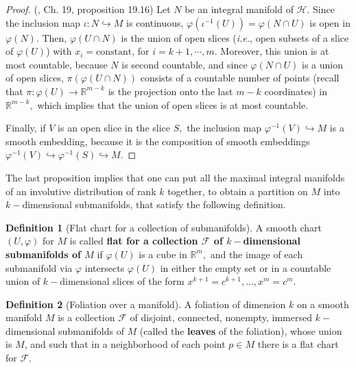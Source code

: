 \documentclass[12pt, letterpaper, reqno]{amsart}
\theoremstyle{definition}
\newtheorem{df}{Definition}
\theoremstyle{plain}
\theoremstyle{remark}
\begin{document}
\begin{proof}(\cite{lee2003introduction}, Ch. 19, proposition 19.16)
	Let $ N $ be an integral manifold of $ \mathcal{H}. $ Since the inclusion map $ \iota: N \hookrightarrow M $ is continuous, $ \varphi( \iota^{-1}(U))=\varphi(N\cap U) $  is open in $ \varphi(N) $. Then, $ \varphi(U\cap N) $ is the union of open slices (\textit{i.e.}, open subsets of a slice of $ \varphi(U)$) with $ x_i=\text{constant} $, for $ i=k+1,\cdots,m.$ Moreover, this union is at most countable, because $ N $ is second countable, and since $ \varphi(N\cap U) $ is a union of open slices, $ \pi(\varphi(U\cap N)) $ consists of a countable number of points (recall that $ \pi: \varphi(U) \rightarrow \mathbb{R}^{m-k} $ is the projection onto the last $ m-k $ coordinates) in $ \mathbb{R}^{m-k}, $ which implies that the union of open slices is at most countable.  

	Finally, if $ V $ is an open slice in the slice $ S, $ the inclusion map $ \varphi^{-1}(V) \hookrightarrow M $ is a smooth embedding, because it is the composition of smooth embeddings $ \varphi^{-1}(V)\hookrightarrow \varphi^{-1}(S) \hookrightarrow M.$ 
\end{proof}

The last proposition implies that one can put all the maximal integral manifolds of an involutive distribution of rank $ k $  together, to obtain a partition on $ M $ into $ k- $dimensional submanifolds, that satisfy the following definition.
\begin{df}[Flat chart for a collection of submanifolds]
	A smooth chart $ (U,\varphi) $ for $ M $ is called \textbf{flat for a collection $ \mathcal{F} $ of $ k- $dimensional submanifolds of $ M $} if $ \varphi(U) $ is a cube in $ \mathbb{R}^m, $ and the image of each submanifold via $ \varphi $ intersects $ \varphi(U) $ in either the empty set or in a countable union of $ k- $dimensional slices of the form $ x^{k+1}=c^{k+1},\dots,x^m=c^m. $   
\end{df}

\begin{df}[Foliation over a manifold]
	A foliation of dimension $ k $ on a smooth manifold $ M $ is a collection $ \mathcal{F} $ of disjoint, connected, nonempty, immersed $ k- $dimensional submanifolds of $ M $ (called the \textbf{leaves} of the foliation), whose union is $ M $, and such that in a neighborhood of each point $ p\in M $ there is a flat chart for $ \mathcal{F}. $  
\end{df}
\end{document}
